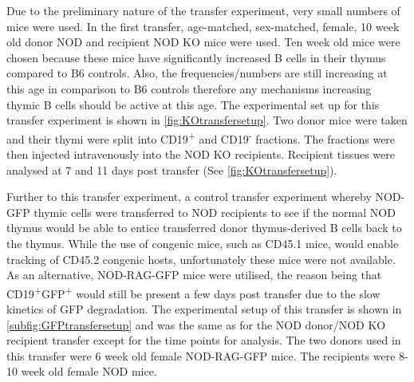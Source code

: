 Due to the preliminary nature of the transfer experiment, very small numbers of mice were used.
In the first transfer, age-matched, sex-matched, female, 10 week old donor NOD and recipient NOD KO mice were used.
Ten week old mice were chosen because these mice have significantly increased B cells in their thymus compared to B6 controls.
Also, the frequencies/numbers are still increasing at this age in comparison to B6 controls therefore any mechanisms increasing thymic B cells should be active at this age.
The experimental set up for this transfer experiment is shown in \cref{fig:KOtransfersetup}.
Two donor mice were taken and their thymi were split into CD19\textsuperscript{+} and CD19\textsuperscript{-} fractions.
The fractions were then injected intravenously into the NOD KO recipients.
Recipient tissues were analysed at 7 and 11 days post transfer (See \cref{fig:KOtransfersetup}).

Further to this transfer experiment, a control transfer experiment whereby NOD-GFP thymic cells were transferred to NOD recipients to see if the normal NOD thymus would be able to entice transferred donor thymus-derived B cells back to the thymus.
While the use of congenic mice, such as CD45.1 mice, would enable tracking of CD45.2 congenic hosts, unfortunately these mice were not available.
As an alternative, NOD-RAG-GFP mice were utilised, the reason being that CD19\textsuperscript{+}GFP\textsuperscript{+} would still be present a few days post transfer due to the slow kinetics of GFP degradation.
The experimental setup of this transfer is shown in \cref{subfig:GFPtransfersetup} and was the same as for the NOD donor/NOD KO recipient transfer except for the time points for analysis.
The two donors used in this transfer were 6 week old female NOD-RAG-GFP mice. 
The recipients were 8-10 week old female NOD mice.

